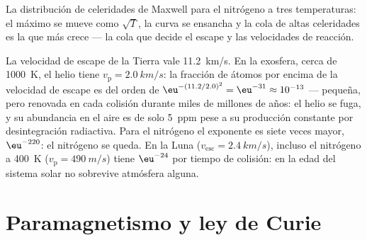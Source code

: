 \begin{omfigure}

{\small La distribución de celeridades de Maxwell para el nitrógeno a tres
temperaturas: el máximo se mueve como $\sqrt T$, la curva se ensancha y la
cola de altas celeridades es la que más crece --- la cola que decide el escape
y las velocidades de reacción.}
\end{omfigure}

\begin{example}\label{ex:b2:boltzmann-factor:escape}
La velocidad de escape de la Tierra vale \qty{11.2}{km/s}. En la exosfera, cerca de
\qty{1000}{K}, el helio tiene $v_{\text{p}} = \qty{2.0}{km/s}$: la fracción de
átomos por encima de la velocidad de escape es del orden de $\eu^{-(11.2/2.0)^2} = \eu^{-31}
\approx 10^{-13}$ --- pequeña, pero renovada en cada colisión durante miles de millones
de años: el helio se fuga, y su abundancia en el aire es de solo
\qty{5}{ppm} pese a su producción constante por desintegración radiactiva. Para el
nitrógeno el exponente es siete veces mayor, $\eu^{-220}$: el nitrógeno se queda.
En la Luna ($v_{\text{esc}} = \qty{2.4}{km/s}$), incluso el nitrógeno a
\qty{400}{K} ($v_{\text{p}} = \qty{490}{m/s}$) tiene $\eu^{-24}$ por tiempo de colisión:
en la edad del sistema solar no sobrevive atmósfera alguna.
\end{example}

\section{Paramagnetismo y ley de Curie}

